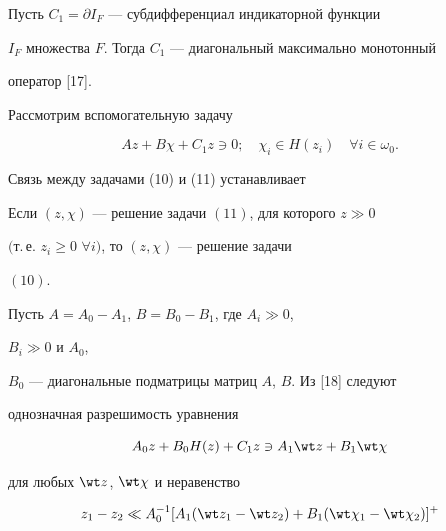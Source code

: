 Пусть $C_1=\partial I_{F}$ --- субдифференциал индикаторной функции


$I_{F}$ множества $F$. Тогда $C_1$ --- диагональный максимально монотонный


оператор [17].





Рассмотрим вспомогательную задачу


\begin{equation}\label{11}


Az + B\chi + C_{1}z \ni 0; \quad \chi_{i} \in H(z_{i})


\quad \forall i \in \omega_0.


\end{equation}





Связь между задачами (10) и (11) устанавливает





\begin{lem}


Если $(z,\chi)$ --- решение задачи $(11)$, для которого $z\gg0$


$($т.\,е. $z_{i} \geq 0$ $\forall i)$, то $(z,\chi)$ --- решение задачи


$(10)$.


\end{lem}





Пусть $A=A_0 -A_1$, $B=B_0 - B_1$, где $A_{i}\gg0$,


$B_{i}\gg0$ и $A_0$,


$B_0$ --- диагональные подматрицы матриц $A$, $B$. Из [18] следуют


однозначная разрешимость уравнения





\begin{equation}\label{12}


A_0 z + B_0 H(z) + C_1 z \ni A_1 \wt z +B_1 \wt \chi


\end{equation}


для любых $\wt z$, $\wt \chi$ и неравенство


\begin{equation}\label{13}


z_1-z_2 \ll A_0^{-1} [ A_1 (\wt z_1 -\wt z_2)


+B_1 (\wt \chi_1 - \wt \chi_2) ]^+


\end{equation}


